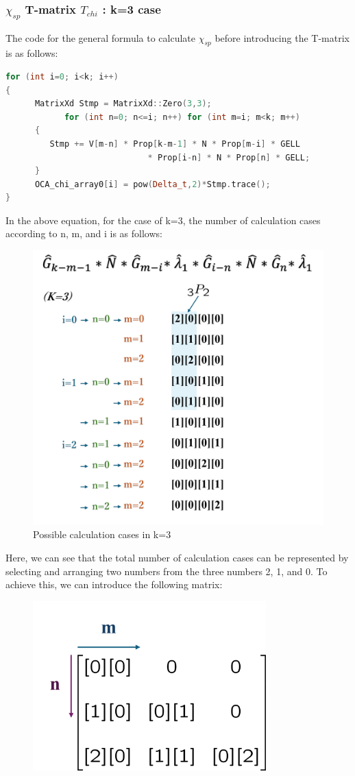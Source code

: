 \documentclass{article}[12pt]
\numberwithin{equation}{section}
\begin{document}
\begin{spacing}{1.5}
\subsubsection*{$\chi_{sp}$ T-matrix $\hat{T}_{chi}$ : k=3 case}
The code for the general formula to calculate  $\chi_{sp}$ before introducing the T-matrix is as follows:
\begin{lstlisting}[language=C++, caption=Full One-crossing Approximation implementation code]
for (int i=0; i<k; i++)
{
	  MatrixXd Stmp = MatrixXd::Zero(3,3);
			for (int n=0; n<=i; n++) for (int m=i; m<k; m++)
      {
         Stmp += V[m-n] * Prop[k-m-1] * N * Prop[m-i] * GELL 
					         * Prop[i-n] * N * Prop[n] * GELL;
      }
      OCA_chi_array0[i] = pow(Delta_t,2)*Stmp.trace();
}
\end{lstlisting}
In the above equation, for the case of k=3, the number of calculation cases according to n, m, and i is as follows:
\begin{figure}[htbp]
  \centerline{\includegraphics[width=12cm]{TexFigure/Tmat.png}}
  \caption{Possible calculation cases in k=3}
\end{figure}
Here, we can see that the total number of calculation cases can be represented by selecting and arranging two numbers from the three numbers 2, 1, and 0. To achieve this, we can introduce the following matrix:
\begin{figure}[htbp]
  \centerline{\includegraphics[width=9cm]{TexFigure/Tmat2.png}}

\end{figure}
\end{spacing}
\end{document}
